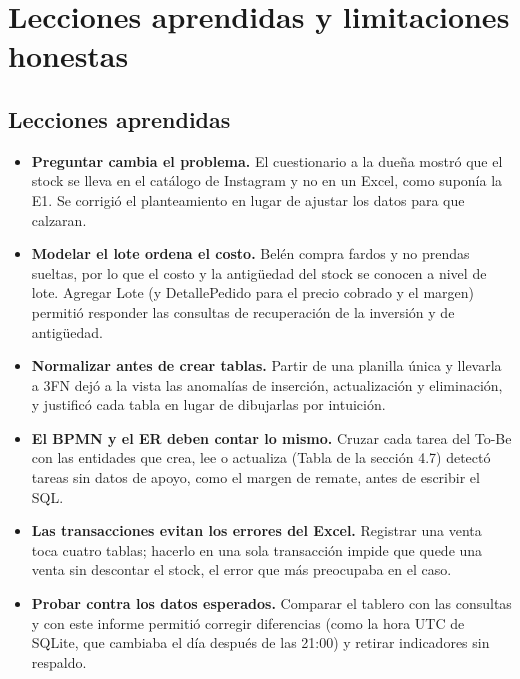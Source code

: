 \documentclass[11pt,letterpaper]{article}
\begin{document}
\section{Lecciones aprendidas y limitaciones honestas}

\subsection{Lecciones aprendidas}
\begin{itemize}
\item \textbf{Preguntar cambia el problema.} El cuestionario a la dueña mostró que el stock se lleva en el catálogo de Instagram y no en un Excel, como suponía la E1. Se corrigió el planteamiento en lugar de ajustar los datos para que calzaran.
\item \textbf{Modelar el lote ordena el costo.} Belén compra fardos y no prendas sueltas, por lo que el costo y la antigüedad del stock se conocen a nivel de lote. Agregar Lote (y DetallePedido para el precio cobrado y el margen) permitió responder las consultas de recuperación de la inversión y de antigüedad.
\item \textbf{Normalizar antes de crear tablas.} Partir de una planilla única y llevarla a 3FN dejó a la vista las anomalías de inserción, actualización y eliminación, y justificó cada tabla en lugar de dibujarlas por intuición.
\item \textbf{El BPMN y el ER deben contar lo mismo.} Cruzar cada tarea del To-Be con las entidades que crea, lee o actualiza (Tabla de la sección 4.7) detectó tareas sin datos de apoyo, como el margen de remate, antes de escribir el SQL.
\item \textbf{Las transacciones evitan los errores del Excel.} Registrar una venta toca cuatro tablas; hacerlo en una sola transacción impide que quede una venta sin descontar el stock, el error que más preocupaba en el caso.
\item \textbf{Probar contra los datos esperados.} Comparar el tablero con las consultas y con este informe permitió corregir diferencias (como la hora UTC de SQLite, que cambiaba el día después de las 21:00) y retirar indicadores sin respaldo.
\end{itemize}

\newpage
\end{document}
